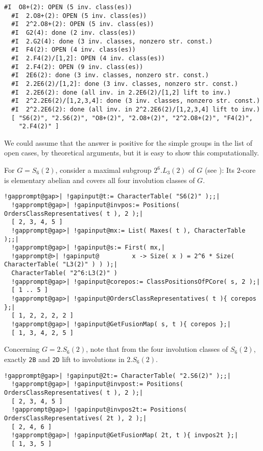 \documentclass[a4paper,11pt]{report}
\begin{document}
{{{\begin{Verbatim}[commandchars=!@|,fontsize=\small,frame=single,label=Example]
  #I  O8+(2): OPEN (5 inv. class(es))
  #I  2.O8+(2): OPEN (5 inv. class(es))
  #I  2^2.O8+(2): OPEN (5 inv. class(es))
  #I  G2(4): done (2 inv. class(es))
  #I  2.G2(4): done (3 inv. classes, nonzero str. const.)
  #I  F4(2): OPEN (4 inv. class(es))
  #I  2.F4(2)/[1,2]: OPEN (4 inv. class(es))
  #I  2.F4(2): OPEN (9 inv. class(es))
  #I  2E6(2): done (3 inv. classes, nonzero str. const.)
  #I  2.2E6(2)/[1,2]: done (3 inv. classes, nonzero str. const.)
  #I  2.2E6(2): done (all inv. in 2.2E6(2)/[1,2] lift to inv.)
  #I  2^2.2E6(2)/[1,2,3,4]: done (3 inv. classes, nonzero str. const.)
  #I  2^2.2E6(2): done (all inv. in 2^2.2E6(2)/[1,2,3,4] lift to inv.)
  [ "S6(2)", "2.S6(2)", "O8+(2)", "2.O8+(2)", "2^2.O8+(2)", "F4(2)", 
    "2.F4(2)" ]
\end{Verbatim}
 

 We could assume that the answer is positive for the simple groups in the list
of open cases, by theoretical arguments, but it is easy to show this
computationally. 

 For $G = S_6(2)$, consider a maximal subgroup $2^6.L_3(2)$ of $G$ (see \cite[p.{\nobreakspace}46]{CCN85}): Its $2$-core is elementary abelian and covers all four involution classes of $G$. 

 
\begin{Verbatim}[commandchars=!@|,fontsize=\small,frame=single,label=Example]
  !gapprompt@gap>| !gapinput@t:= CharacterTable( "S6(2)" );;|
  !gapprompt@gap>| !gapinput@invpos:= Positions( OrdersClassRepresentatives( t ), 2 );|
  [ 2, 3, 4, 5 ]
  !gapprompt@gap>| !gapinput@mx:= List( Maxes( t ), CharacterTable );;|
  !gapprompt@gap>| !gapinput@s:= First( mx,|
  !gapprompt@>| !gapinput@         x -> Size( x ) = 2^6 * Size( CharacterTable( "L3(2)" ) ) );|
  CharacterTable( "2^6:L3(2)" )
  !gapprompt@gap>| !gapinput@corepos:= ClassPositionsOfPCore( s, 2 );|
  [ 1 .. 5 ]
  !gapprompt@gap>| !gapinput@OrdersClassRepresentatives( t ){ corepos };|
  [ 1, 2, 2, 2, 2 ]
  !gapprompt@gap>| !gapinput@GetFusionMap( s, t ){ corepos };|
  [ 1, 3, 4, 2, 5 ]
\end{Verbatim}
 

 Concerning $G = 2.S_6(2)$, note that from the four involution classes of $S_6(2)$, exactly \texttt{2B} and \texttt{2D} lift to involutions in $2.S_6(2)$. 

 
\begin{Verbatim}[commandchars=!@|,fontsize=\small,frame=single,label=Example]
  !gapprompt@gap>| !gapinput@2t:= CharacterTable( "2.S6(2)" );;|
  !gapprompt@gap>| !gapinput@invpost:= Positions( OrdersClassRepresentatives( t ), 2 );|
  [ 2, 3, 4, 5 ]
  !gapprompt@gap>| !gapinput@invpos2t:= Positions( OrdersClassRepresentatives( 2t ), 2 );|
  [ 2, 4, 6 ]
  !gapprompt@gap>| !gapinput@GetFusionMap( 2t, t ){ invpos2t };|
  [ 1, 3, 5 ]
\end{Verbatim}
 

}}}
\end{document}
